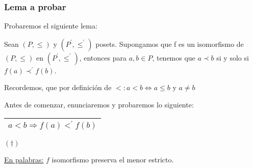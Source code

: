 \begin{frame}
	\frametitle{Lema a probar}

	\PN Probaremos el siguiente lema:

	\vspace{3mm}
	\begin{lemma}{}
		\PN Sean $(P, \leq)$ y $(P^{\prime}, \leq^{\prime})$ posets. Supongamos que f es un isomorfismo de $(P, \leq)$ en
		$(P^{\prime}, \leq^{\prime})$, entonces para $a, b \in P$, tenemos que $a \prec b$ si y solo si $f(a) \prec^{\prime}
		f(b)$.
	\end{lemma}

	\vspace{5mm}
	\PN Recordemos, que por definición de $<: a < b \Leftrightarrow a \leq b$ y $a \neq b$

	\vspace{3mm}
	\PN Antes de comenzar, enunciaremos y probaremos lo siguiente:
	\begin{center}
		\begin{tabular}{|c|} \hline $a < b \Rightarrow f(a) <^{\prime} f(b)$ \\\hline \end{tabular} $(\dag)$
	\end{center}

	\PN \underline{En palabras:} $f$ isomorfismo preserva el menor estricto.
\end{frame}
